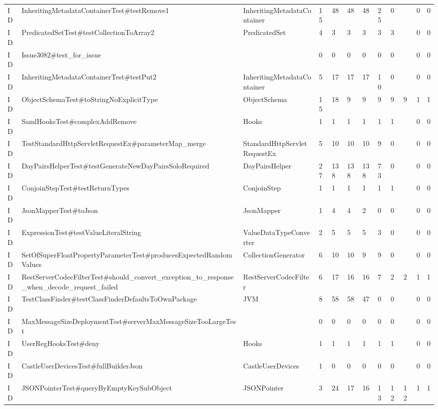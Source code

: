 \begin{table}[t]
\begin{tabular}{llllllllllll}
ID & InheritingMetadataContainerTest\#testRemove1 & InheritingMetadataContainer & 15 & 48 & 48 & 48 & 25 & 0 &  & 0 & 0 \\
ID & PredicatedSetTest\#testCollectionToArray2 & PredicatedSet & 4 & 3 & 3 & 3 & 3 & 3 &  & 0 & 0 \\
ID & Issue3082\#test\_for\_issue &  & 0 & 0 & 0 & 0 & 0 & 0 &  & 0 & 0 \\
ID & InheritingMetadataContainerTest\#testPut2 & InheritingMetadataContainer & 5 & 17 & 17 & 17 & 10 & 0 &  & 0 & 0 \\
ID & ObjectSchemaTest\#toStringNoExplicitType & ObjectSchema & 15 & 18 & 9 & 9 & 9 & 9 & 9 & 1 & 1 \\
ID & SamlHooksTest\#complexAddRemove & Hooks & 1 & 1 & 1 & 1 & 1 & 1 &  & 0 & 0 \\
ID & TestStandardHttpServletRequestEx\#parameterMap\_merge & StandardHttpServletRequestEx & 5 & 10 & 10 & 10 & 9 & 0 &  & 0 & 0 \\
ID & DayPairsHelperTest\#testGenerateNewDayPairsSoloRequired & DayPairsHelper & 27 & 138 & 138 & 138 & 73 & 0 &  & 0 & 0 \\
ID & ConjoinStepTest\#testReturnTypes & ConjoinStep & 1 & 1 & 1 & 1 & 1 & 1 &  & 0 & 0 \\
ID & JsonMapperTest\#toJson & JsonMapper & 1 & 4 & 4 & 2 & 0 & 0 &  & 0 & 0 \\
ID & ExpressionTest\#testValueLiteralString & ValueDataTypeConverter & 2 & 5 & 5 & 5 & 3 & 0 &  & 0 & 0 \\
ID & SetOfSuperFloatPropertyParameterTest\#producesExpectedRandomValues & CollectionGenerator & 6 & 10 & 10 & 9 & 9 & 0 &  & 0 & 0 \\
ID & RestServerCodecFilterTest\#should\_convert\_exception\_to\_response\_when\_decode\_request\_failed & RestServerCodecFilter & 6 & 17 & 16 & 16 & 7 & 2 & 2 & 1 & 1 \\
ID & TestClassFinder\#testClassFinderDefaultsToOwnPackage & JVM & 8 & 58 & 58 & 47 & 0 & 0 &  & 0 & 0 \\
ID & MaxMessageSizeDeploymentTest\#serverMaxMessageSizeTooLargeTest &  & 0 & 0 & 0 & 0 & 0 & 0 &  & 0 & 0 \\
ID & UserRegHooksTest\#deny & Hooks & 1 & 1 & 1 & 1 & 1 & 1 &  & 0 & 0 \\
ID & CastleUserDevicesTest\#fullBuilderJson & CastleUserDevices & 1 & 0 & 0 & 0 & 0 & 0 &  & 0 & 0 \\
ID & JSONPointerTest\#queryByEmptyKeySubObject & JSONPointer & 3 & 24 & 17 & 16 & 13 & 12 & 12 & 1 & 1 \\

\end{tabular}
\end{table}
